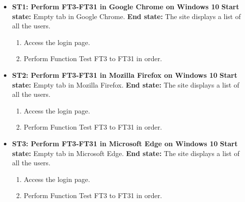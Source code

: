 \documentclass{article}
\begin{document}
\begin{itemize}
		\item \textbf{ST1: Perform FT3-FT31 in Google Chrome on Windows 10} \newline
		\textbf{Start state:} Empty tab in Google Chrome.  \newline
		\textbf{End state:} The site displays a list of all the users.
		\begin{enumerate}
			\item Access the login page.
			\item Perform Function Test FT3 to FT31 in order. 
		\end{enumerate}
		
	\item \textbf{ST2: Perform FT3-FT31 in Mozilla Firefox on Windows 10} \newline
		\textbf{Start state:} Empty tab in  Mozilla Firefox.  \newline
		\textbf{End state:} The site displays a list of all the users.
		\begin{enumerate}
			\item Access the login page.
			\item Perform Function Test FT3 to FT31 in order. 
		\end{enumerate}
		
		\item \textbf{ST3: Perform FT3-FT31 in Microsoft Edge on Windows 10} \newline
		\textbf{Start state:} Empty tab in Microsoft Edge.  \newline
		\textbf{End state:} The site displays a list of all the users.
		\begin{enumerate}
			\item Access the login page.
			\item Perform Function Test FT3 to FT31 in order. 
		\end{enumerate}

\end{itemize}
		
\end{document}
